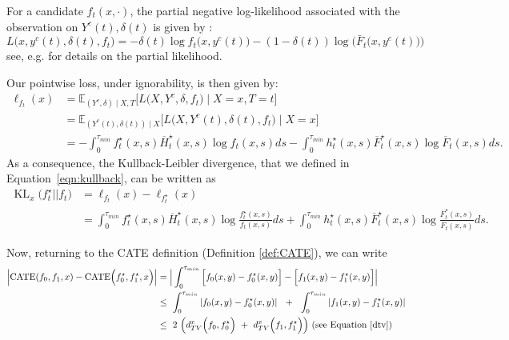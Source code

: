 \documentclass[12pt]{article}
\theoremstyle{plain}
\theoremstyle{definition}
\theoremstyle{remark}
\DeclareMathOperator{\KL}{\text{KL}}
\begin{document}
For a candidate $f_t(x,\cdot)$, the partial negative log-likelihood associated with the observation on $Y^c(t), \delta(t)$ is given by : 
\begin{equation}\label{eq:survloss}
    L\big(x, y^{c}(t), \delta(t), f_{t}\big)=-\delta(t) \log f_{t}\big(x, y^{c}(t)\big)  -(1-\delta(t)) \log \Big(\bar{F}_{t}\big(x, y^{c}(t)\big)\Big)
\end{equation}
see, e.g. \cite{klein2003survival} for details on the partial likelihood.

Our pointwise loss, under ignorability, is then given by: 
\begin{align*}
\ell_{f_{t}}(x)&= \mathbb{E}_{(Y^c,\delta) \mid X,T}\Big[L\Big( X,Y^{c} ,\delta ,f_t\Big) \mid X=x, T=t\Big]
\\
&=\mathbb{E}_{(Y^c(t),\delta(t)) \mid X}\Big[L\Big( X,Y^{c}(t)  ,\delta(t) ,f_t\Big) \mid X=x\Big]
\\
& = - \int _{0}^{\tau_{min}}  f^{\star}_{t}( x,s)\overline{H}^{\star}_{t}( x,s) \log f_t(x,s) ds  -  \int _{0}^{\tau_{min}} h^{\star}_{t}( x,s)\overline{F}^{\star}_{t}( x,s) \log \overline{F}_{t}( x,s)ds.
\end{align*}
As a consequence, the Kullback-Leibler divergence, that we defined in Equation~\eqref{eqn:kullback}, can be written as
\begin{align}
  \KL_x \Big( f^{\star}_{t} ||f_{t}\Big) &= \ell _{f_{t}}( x) -\ell _{f^{\star}_{t}}( x)  \\
  &= \int _{0}^{\tau_{min}}  f^{\star}_{t}( x,s)\overline{H}^{\star}_{t}( x,s) \log \frac{f_t^{\star}(x,s)}{f_t(x,s)} ds  +  \int _{0}^{\tau_{min}} h^{\star}_{t}( x,s)\overline{F}^{\star}_{t}( x,s) \log \frac{\overline{F}_{t}^{\star}( x,s)}{\overline{F}_{t}( x,s)}ds.
\end{align}

 
Now, returning to the CATE definition (Definition \ref{def:CATE}), we can write
\begin{align*}
  \Big|\text{CATE}( f_{0} ,f_{1} ,x) -\text{CATE}\Big( f^{\star}_{0} ,f^{\star}_{1} ,x\Big) \Big|&=\Big|\int_{0}^{\tau_{min}}\Big[ f_{0}( x,y) -f^{\star}_{0}( x,y)\Big] -\Big[ f_{1}( x,y) -f^{\star}_{1}( x,y)\Big] \Big|\\
&\leq \ \int_{0}^{\tau_{min}} |f_{0}( x,y) -f^{\star}_{0}( x,y) |\ \ +\ \ \int_{0}^{\tau_{min}} |f_{1}( x,y) -f^{\star}_{1}( x,y) |\ \\
&\leq \ 2\ \Big( d^{x}_{TV}\Big( f_{0} ,f^{\star}_{0}\Big) \ +\ d^{x}_{TV}\Big( f_{1} ,f^{\star}_{1}\Big)\Big) \ (\text{see Equation \ref{dtv}})
\end{align*}
\end{document}

